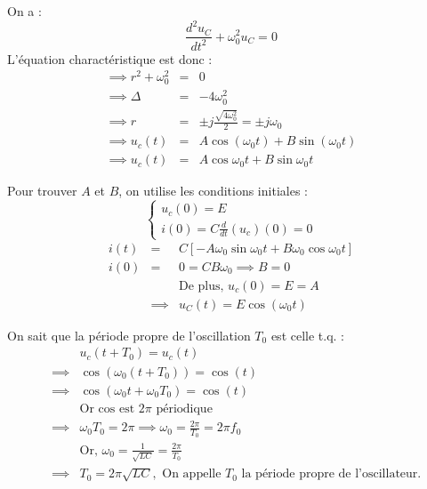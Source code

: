 On a : 
\[
    \frac{d^{2}u_{C}}{dt^{2}} + \omega_{0}^{2}u_{C} = 0
\]
L'équation charactéristique est donc :\\
\begin{eqnarray*}
    \implies r^{2} + \omega_{0}^{2} &=& 0 \\
    \implies \Delta &=& -4\omega_{0}^{2}\\
    \implies r &=& \pm j \frac{\sqrt{4\omega_{0}^{2}}}{2} = \pm j \omega_{0}\\
    \implies  u_{c}(t) &=& A \cos (\omega_{0} t) + B \sin (\omega_{0} t)\\ 
    \implies u_{c}(t) &=& A\cos \omega_{0}t + B \sin \omega_{0}t
\end{eqnarray*}

Pour trouver \(A\) et \(B\), on utilise les conditions initiales :\\
\[
    \begin{cases}
        u_{c}(0) = E\\
        i(0) = C\frac{d}{dt}(u_{c})(0) = 0
    \end{cases}
\]
\begin{eqnarray*}
    i(t) &=& C \left[ -A \omega_{0} \sin \omega_{0}t + B \omega_{0} \cos \omega_{0}t  \right]\\
    i(0) &=& 0 = CB \omega _{0} \implies B = 0 \\
    &&\text{De plus, } u_{c}(0) = E = A\\
    &\implies& u_{C}(t) = E\cos(\omega_{0}t)
\end{eqnarray*}

On sait que la période propre de l'oscillation \(T_{0}\) est celle t.q. : \\
\begin{eqnarray*}
    &&u_c(t+T_{0}) = u_{c}(t)\\
    &\implies& \cos (\omega_{0}(t+T_{0})) = \cos(t)\\
    &\implies& \cos(\omega_{0}t + \omega_{0}T_{0}) = \cos(t)\\
    &&\text{Or cos est } 2\pi \text{ périodique}\\
    &\implies& \omega _{0} T_{0} = 2\pi \implies \omega _{0} = \frac{2\pi}{T_{0}} = 2\pi f_{0}\\
    &&\text{Or, } \omega_{0} = \frac{1}{\sqrt{LC}} = \frac{2\pi}{T_{0}}\\
    &\implies& T_{0} = 2\pi\sqrt{LC}, \text{ On appelle } T_{0} \text{ la période propre de l'oscillateur.}
\end{eqnarray*}

